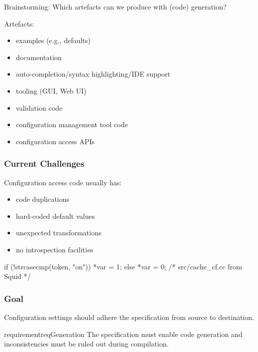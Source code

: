 \begin{assignment}
	\begin{task}
	Brainstorming: Which artefacts can we produce with (code) generation?
	\end{task}
\end{assignment}

\begin{frame}
	Artefacts:
	\begin{itemize}
	\item examples (e.g., defaults)
	\item documentation
	\item auto-completion/syntax highlighting/IDE support
	\item tooling (GUI, Web UI)
	\item validation code
	\item configuration management tool code
	\item configuration access APIs
	\end{itemize}
\end{frame}

\begin{frame}[fragile]
	\frametitle{Current Challenges}
	Configuration access code usually has:
	\pause
	\begin{itemize}
	\item code duplications
	\item hard-coded default values
	\item unexpected transformations
	\item no introspection facilities
	\end{itemize}
	\begin{example}
	\begin{code}[gobble=4,language=C++]
	if (!strcasecmp(token, "on")) {
		*var = 1;
	} else {
		*var = 0;
	} /* src/cache_cf.cc from Squid */
	\end{code}\end{example}
\end{frame}

\begin{frame}
	\frametitle{Goal}

	\begin{goal}
	Configuration settings should adhere the specification from source to destination.
	\end{goal}

	\begin{restatable}{requirement}{reqGeneration}
	The specification must enable code generation and inconsistencies must be ruled out during compilation.
	\end{restatable}
\end{frame}


